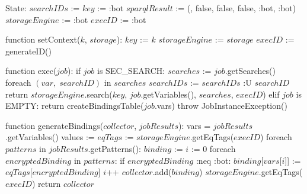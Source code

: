State:
    $searchIDs$ := {}
    $key$ := :bot
    $sparqlResult$ := ({}, false, false, false, :bot, :bot)
    $storageEngine$ := :bot
    $execID$ := :bot

function setContext($k$, $storage$):
    $key$ := $k$
    $storageEngine$ := $storage$
    $execID$ := generateID()

function exec($job$):
    if $job$ is SEC_SEARCH:
        $searches$ := $job$.getSearches()
        foreach $(var, \; searchID)$ in $searches$
            $searchIDs$ :=  $searchIDs$ :U { $searchID$ }
        return $storageEngine$.search($key$, $job$.getVariables(), $searches$, $execID$)
    elif $job$ is EMPTY:
        return createBindingsTable($job$.vars)
    throw JobInstanceException()

function generateBindings($collector$, $jobResults$):
    vars = $jobResults$.getVariables()
    values := {}
    $eqTags$ := $storageEngine$.getEqTags($execID$)
    foreach $patterns$ in $jobResults$.getPatterns():
        $binding$ := {}
        $i$ := 0
        foreach $encryptedBinding$ in $patterns$:
            if $encryptedBinding$ :neq :bot:
                $binding$[$vars$[$i$]] := $eqTags$[$encryptedBinding$]
            $i$++
        $collector$.add($binding$)
    $storageEngine$.getEqTags($execID$)
    return $collector$